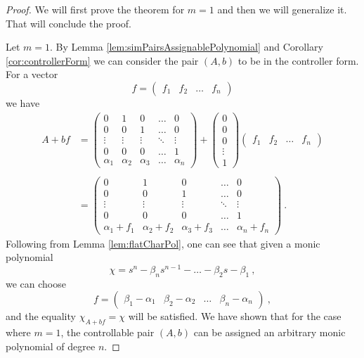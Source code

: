 \begin{proof}
    We will first prove the theorem for $m=1$ and then we will generalize it. That will conclude the proof.

    Let $m=1$. By Lemma \ref{lem:simPairsAssignablePolynomial} and Corollary \ref{cor:controllerForm} we can consider the pair $(A,b)$ to be in the controller form. For a vector 
    \begin{equation*}
        f=\begin{pmatrix}
            f_1&f_2&\ldots&f_n
        \end{pmatrix}
    \end{equation*}
    we have 
    \begin{align*}
        A+bf&=
        \begin{pmatrix}
			0 & 1 & 0 & \ldots & 0 \\
			0 & 0 & 1 & \ldots & 0 \\
			\vdots & \vdots & \vdots & \ddots & \vdots \\
			0 & 0 & 0 & \ldots & 1 \\
			\alpha_1 & \alpha_2 & \alpha_3 & \ldots & \alpha_n
        \end{pmatrix}
        +
        \begin{pmatrix}
            0 \\
            0 \\
            0 \\
            \vdots \\
            1
        \end{pmatrix}
        \begin{pmatrix}
            f_1&f_2&\ldots&f_n
        \end{pmatrix}
        \\
        \\
        &=
        \begin{pmatrix}
			0 & 1 & 0 & \ldots & 0 \\
			0 & 0 & 1 & \ldots & 0 \\
			\vdots & \vdots & \vdots & \ddots & \vdots \\
			0 & 0 & 0 & \ldots & 1 \\
            \alpha_1+f_1 & \alpha_2+f_2 & \alpha_3+f_3 & \ldots & \alpha_n+f_n
        \end{pmatrix}\ .
    \end{align*}
    Following from Lemma \ref{lem:flatCharPol}, one can see that given a monic polynomial
    $$\chi=s^n-\beta_ns^{n-1}-\ldots-\beta_2s-\beta_1\ ,$$
    we can choose
    $$f=\begin{pmatrix}
        \beta_1-\alpha_1&\beta_2-\alpha_2&\ldots&\beta_n-\alpha_n
    \end{pmatrix}\ ,$$
    and the equality $\chi_{A+bf}=\chi$ will be satisfied. We have shown that for the case where $m=1$, the controllable pair $(A,b)$ can be assigned an arbitrary monic polynomial of degree $n$.


\end{proof}
